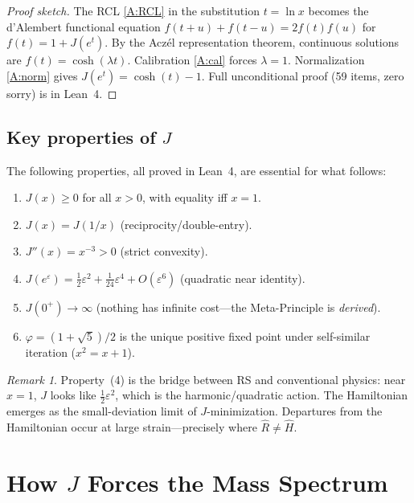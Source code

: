 \documentclass[11pt,a4paper]{article}
\theoremstyle{plain}
\theoremstyle{definition}
\theoremstyle{remark}
\newtheorem{remark}[theorem]{Remark}
\newcommand{\Jcost}{J}
\newcommand{\Rhat}{\hat{R}}
\newcommand{\vp}{\varphi}
\begin{document}
\begin{proof}[Proof sketch]
The RCL \ref{A:RCL} in the substitution $t = \ln x$ becomes the
d'Alembert functional equation $f(t+u) + f(t-u) = 2f(t)f(u)$ for
$f(t) = 1 + \Jcost(e^t)$.  By the Acz\'el representation theorem,
continuous solutions are $f(t) = \cosh(\lambda t)$.  Calibration
\ref{A:cal} forces $\lambda = 1$.  Normalization \ref{A:norm} gives
$\Jcost(e^t) = \cosh(t) - 1$.  Full unconditional proof (59 items,
zero sorry) is in Lean~4.
\end{proof}

\subsection{Key properties of $\Jcost$}

The following properties, all proved in Lean~4, are essential
for what follows:

\begin{enumerate}[nosep]
\item $\Jcost(x) \geq 0$ for all $x > 0$, with equality iff $x = 1$.
\item $\Jcost(x) = \Jcost(1/x)$ (reciprocity/double-entry).
\item $\Jcost''(x) = x^{-3} > 0$ (strict convexity).
\item $\Jcost(e^\varepsilon) = \tfrac{1}{2}\varepsilon^2
      + \tfrac{1}{24}\varepsilon^4 + O(\varepsilon^6)$
      (quadratic near identity).
\item $\Jcost(0^+) \to \infty$ (nothing has infinite cost---the
      Meta-Principle is \emph{derived}).
\item $\vp = (1+\sqrt{5})/2$ is the unique positive fixed point
      under self-similar iteration ($x^2 = x + 1$).
\end{enumerate}

\begin{remark}
Property~(4) is the bridge between RS and conventional physics:
near $x = 1$, $\Jcost$ looks like $\tfrac{1}{2}\varepsilon^2$,
which is the harmonic/quadratic action.  The Hamiltonian emerges
as the small-deviation limit of $\Jcost$-minimization.  Departures
from the Hamiltonian occur at large strain---precisely where
$\Rhat \neq \hat{H}$.
\end{remark}

\section{How $\Jcost$ Forces the Mass Spectrum}
\label{sec:mass}
\end{document}
